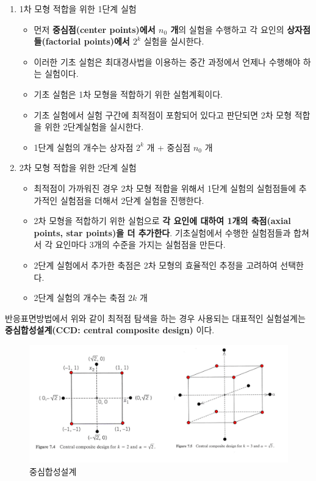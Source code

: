 \documentclass[
]{book}
\providecommand{\tightlist}{%
  \setlength{\itemsep}{0pt}\setlength{\parskip}{0pt}}
\theoremstyle{definition}
\theoremstyle{definition}
\theoremstyle{definition}
\theoremstyle{definition}
\theoremstyle{remark}
\begin{document}
\begin{enumerate}
\def\labelenumi{(\arabic{enumi})}
\tightlist
\item
  1차 모형 적합을 위한 1단계 실험

  \begin{itemize}
  \tightlist
  \item
    먼저 \textbf{중심점(center points)에서 \(n_0\) 개}의 실험을 수행하고 각 요인의 \textbf{상자점들(factorial points)에서 \(2^k\)} 실험을 실시한다.
  \item
    이러한 기초 실험은 최대경사법을 이용하는 중간 과정에서 언제나 수행해야 하는 실험이다.
  \item
    기초 실험은 1차 모형을 적합하기 위한 실험계획이다.
  \item
    기초 실험에서 실험 구간에 최적점이 포함되어 있다고 판단되면 2차 모형 적합을 위한 2단계실험을 실시한다.
  \item
    1단계 실험의 개수는 상자점 \(2^k\) 개 + 중심점 \(n_0\) 개
  \end{itemize}
\item
  2차 모형 적합을 위한 2단계 실험

  \begin{itemize}
  \tightlist
  \item
    최적점이 가까워진 경우 2차 모형 적합을 위해서 1단계 실험의 실험점들에 추가적인 실험점을 더해서 2단계 실험을 진행한다.
  \item
    2차 모형을 적합하기 위한 실험으로 \textbf{각 요인에 대하여 1개의 축점(axial points, star points)을 더 추가한다}. 기초실험에서 수행한 실험점들과 합쳐서 각 요인마다 3개의 수준을 가지는 실험점을 만든다.
  \item
    2단계 실험에서 추가한 축점은 2차 모형의 효율적인 추정을 고려하여 선택한다.
  \item
    2단계 실험의 개수는 축점 \(2k\) 개
  \end{itemize}
\end{enumerate}

반응표면방법에서 위와 같이 최적점 탐색을 하는 경우 사용되는 대표적인 실험설계는 \textbf{중심합성설계(CCD: central composite design)} 이다.

\begin{figure}

{\centering \includegraphics[width=0.8\linewidth]{myimages/ccc} 

}

\caption{중심합성설계}\label{fig:unnamed-chunk-25}
\end{figure}
\end{document}
